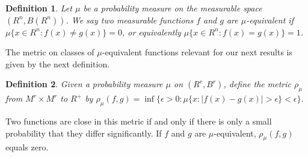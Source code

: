 \documentclass[12pt]{amsart}
\newtheorem{definition}{Definition}
\theoremstyle{plain}
\theoremstyle{definition}
\theoremstyle{remark}
\numberwithin{equation}{section}
\numberwithin{thm}{section}
\begin{document}
\begin{definition}
    Let $\mu$ be a probability measure on the measurable space $(R^n,B(R^n))$. We say two measurable functions $f$ and $g$ are $\mu$-equivalent if $\mu \{x \in R^n: f(x) \neq g(x)\} =0$, or equivalently $\mu\{x \in R^n:f(x)=g(x)\}=1$.
\end{definition}
The metric on classes of $\mu$-equivalent functions relevant for our next results is given by the next definition.
\begin{definition}
    Given a probability measure $\mu$ on $(R^r,B^r)$, define the metric $\rho_\mu$ from $M^r \times M^r$ to $R^+$ by $\rho_\mu (f,g)=\inf \{ \epsilon > 0 : \mu\{x: |f(x)-g(x)|> \epsilon \} < \epsilon \}.$
\end{definition}

Two functions are close in this metric if and only if there is only a small probability that they differ significantly.  If $f$ and $g$ are $\mu$-equivalent, $\rho_\mu (f,g)$ equals zero.
\end{document}

